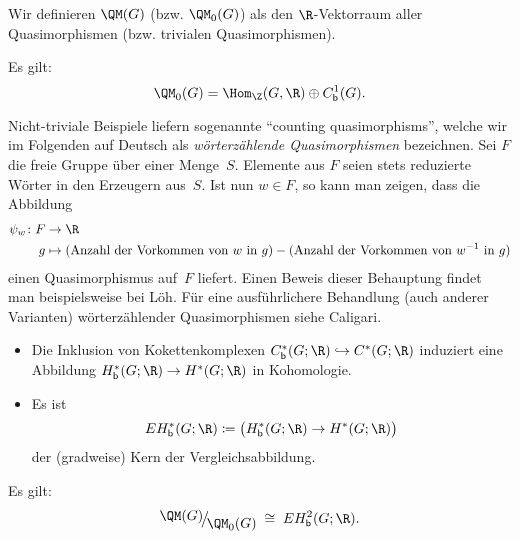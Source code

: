 \begin{thDef}
    Wir definieren $\QM(G)$ (bzw. $\QM_0(G)$) als den $\R$-Vektorraum aller
    Quasimorphismen (bzw. trivialen Quasimorphismen). 
\end{thDef}

\begin{thProposition}
    Es gilt:
    \[ \QM_0(G) = \Hom_\Z(G,\R) \oplus \Cb^1(G)  . \]
\end{thProposition}

\begin{thBeispiel}
    Nicht-triviale Beispiele liefern sogenannte \enquote{counting
    quasimorphisms}, welche wir im Folgenden auf Deutsch als
    \emph{wörterzählende Quasimorphismen} bezeichnen. Sei $F$ die freie Gruppe
    über einer Menge~$S$. Elemente aus $F$ seien stets reduzierte Wörter in den
    Erzeugern aus~$S$. Ist nun $w\in F$, so kann man zeigen, dass die Abbildung
    \begin{align*}
        \psi_w\colon F &\to \R  \\
        g &\mapsto (\text{Anzahl der Vorkommen von $w$ in $g$})
                 - (\text{Anzahl der Vorkommen von $w^{-1}$ in $g$})
    \end{align*}
    einen Quasimorphismus auf~$F$ liefert. Einen Beweis dieser Behauptung findet
    man beispielsweise bei
    Löh\cite[Ch.\,2,.3,\;Lemma\,2.5.11]{lecnotes:loeh:bdcoho}.
    Für eine ausführlichere Behandlung (auch anderer Varianten) wörterzählender
    Quasimorphismen siehe Caligari\cite[Ch.\,2,.2]{bookc:calegari09}.
\end{thBeispiel}

\begin{thErinnerDef}[Vergleichsabbildung]
    \begin{itemize}
        \item
            Die Inklusion von Kokettenkomplexen $\Cb^\ast(G;\R) \hookrightarrow
            C^\ast(G;\R)$ induziert eine Abbildung $\Hb^\ast(G;\R) \to
            H^\ast(G;\R)$ in Kohomologie.
        \item
            Es ist
            \[ E\Hb^\ast(G;\R)
                \defeq \ker\bigl( \Hb^\ast(G;\R) \to H^\ast(G;\R) \bigr)
            \]
            der (gradweise) Kern der Vergleichsabbildung.
    \end{itemize}
\end{thErinnerDef}

\begin{thSatz}
    Es gilt:
    \[ \Quot{\QM(G)}{\QM_0(G)} \;\cong\; E\Hb^2(G;\R)  . \]
\end{thSatz}

